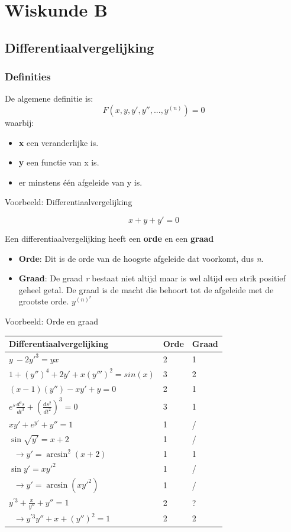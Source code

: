 \documentclass[12pt]{report}
\newcommand{\example}[2]{
      \hrulefill
      
      Voorbeeld: #1
      
      #2
      
      \hrulefill
}
\begin{document}
\part{Wiskunde B}
\chapter{Differentiaalvergelijking}
\section{Definities}
De algemene definitie is:
$$F(x, y, y', y'', ..., y^{(n)}) = 0$$
waarbij: \begin{itemize}
\item \textbf{x} een veranderlijke is.
\item \textbf{y} een functie van x is.
\item er minstens één afgeleide van y is.
\end{itemize}
\example{Differentiaalvergelijking}{
	$$ x + y + y' = 0$$
}

Een differentiaalvergelijking heeft een \textbf{orde} en een \textbf{graad}
\begin{itemize}
	\item \textbf{Orde}: Dit is de orde van de hoogste afgeleide dat voorkomt, dus \textit{n}.
	\item \textbf{Graad}: De graad \textit{r} bestaat niet altijd maar is wel altijd een strik positief geheel getal. De graad is de macht die behoort tot de afgeleide met de grootste orde. $y^{(n)^{r}}$
\end{itemize}
\example{Orde en graad}{
	\begin{center}
		\begin{tabular}{l | l | l}
			Differentiaalvergelijking                          & Orde & Graad \\
			\hline
			$y\ - 2y'^3 = yx$                                  & 2    & 1     \\
			$1 + (y'')^4 + 2y' + x(y''')^2 = sin(x)$           & 3    & 2     \\
			$(x - 1)(y'') - xy' + y = 0$                       & 2    & 1     \\
			$e^s\frac{d^3s}{dt^3} + (\frac{ds^2}{dt^2})^3 = 0$ & 3    & 1     \\
			$xy' + e^{y'} + y'' = 1$                           & 1    & /     \\
			\hline
			$\sin\sqrt {y'} = x + 2$                           & 1    & /     \\
			$\;\;\rightarrow y' = \arcsin^2(x+2)$              & 1    & 1     \\
			\hline
			$\sin y' = xy'^2$                                  & 1    & /     \\
			$\;\;\rightarrow y' = \arcsin(xy'^2)$              & 1    & /     \\
			\hline
			$y^{'3} + \frac{x}{y''} + y'' = 1$                 & 2    & ?     \\
			$\;\;\rightarrow y^{'3}y'' + x + (y'')^2 = 1$      & 2    & 2     
			   
		\end{tabular}
	\end{center}
}
\end{document}
